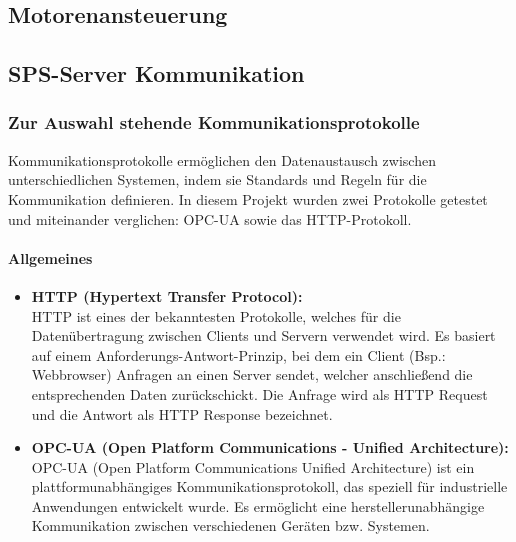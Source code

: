\subsection{Motorenansteuerung}

\subsection{SPS-Server Kommunikation}

    \subsubsection{Zur Auswahl stehende Kommunikationsprotokolle} 
    \label{Kommunikationsprotokolle}

    Kommunikationsprotokolle ermöglichen den Datenaustausch zwischen unterschiedlichen Systemen, indem sie Standards und Regeln für die Kommunikation definieren. In diesem Projekt wurden zwei Protokolle getestet und miteinander verglichen: OPC-UA sowie das HTTP-Protokoll.


         \paragraph{Allgemeines}

        \begin{itemize}
            \item \textbf{HTTP (Hypertext Transfer Protocol):}  \mbox{} \\
            HTTP ist eines der bekanntesten Protokolle, welches für die Datenübertragung zwischen Clients und Servern verwendet wird. Es basiert auf einem Anforderungs-Antwort-Prinzip, bei dem ein Client (Bsp.: Webbrowser) Anfragen an einen Server sendet, welcher anschließend die entsprechenden Daten zurückschickt. Die Anfrage wird als HTTP Request und die Antwort als HTTP Response bezeichnet.\cite{HTTP-Allgemein}
            
            \item \textbf{OPC-UA (Open Platform Communications - Unified Architecture):} \mbox{} \\
            OPC-UA (Open Platform Communications Unified Architecture) ist ein plattformunabhängiges Kommunikationsprotokoll, das speziell für industrielle Anwendungen entwickelt wurde. Es ermöglicht eine herstellerunabhängige Kommunikation zwischen verschiedenen Geräten bzw. Systemen. \cite{OPC-UA}
        \end{itemize}

